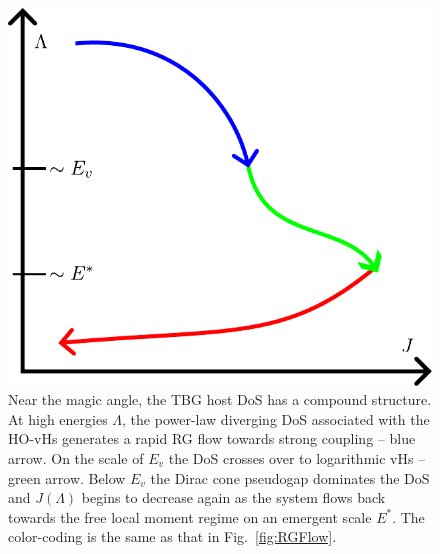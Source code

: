\begin{figure}[t]
	\includegraphics[width=0.8\linewidth]{figures/chapter2/RGFlowColors.pdf}
	\caption{
		\small Near the magic angle, the TBG host DoS has a compound structure. At high energies $\Lambda$, the power-law diverging DoS associated with the HO-vHs generates a rapid RG flow towards strong coupling -- blue arrow. On the scale of $E_v$ the DoS crosses over to logarithmic vHs -- green arrow. Below $E_v$ the Dirac cone pseudogap dominates the DoS and $J(\Lambda)$ begins to decrease again as the system flows back towards the free local moment regime on an emergent scale $E^*$. The color-coding is the same as that in Fig.~\ref{fig:RGFlow}.}
	\label{fig:flow}
\end{figure}



